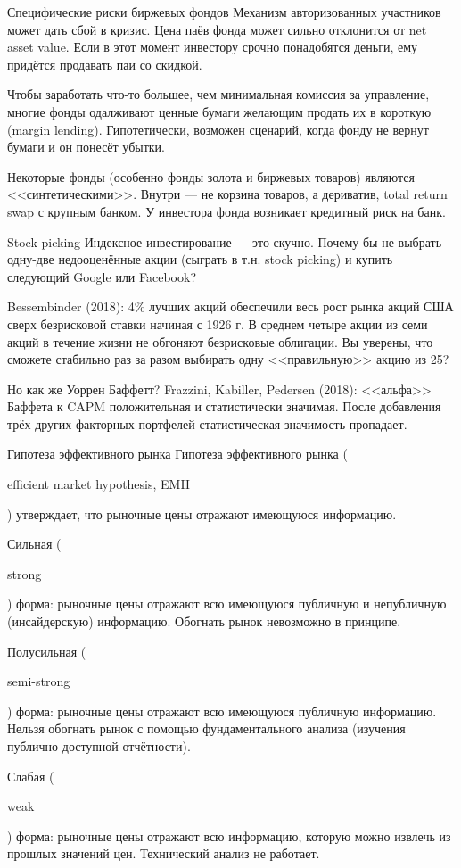 \documentclass{beamer}
\newcommand{\en}[1]{\begin{otherlanguage}{english}#1\end{otherlanguage}}
\begin{document}
\begin{frame}{Специфические риски биржевых фондов}
\justify
Механизм авторизованных участников может дать сбой в кризис. Цена паёв фонда может сильно отклонится от net asset value. Если в этот момент инвестору срочно понадобятся деньги, 
ему придётся продавать паи со скидкой.

\justify
Чтобы заработать что-то большее, чем минимальная комиссия за управление, многие 
фонды одалживают ценные бумаги желающим продать их в короткую (margin lending). 
Гипотетически, возможен сценарий, когда фонду не вернут бумаги и он понесёт 
убытки.

\justify
Некоторые фонды (особенно фонды золота и биржевых товаров) являются 
<<синтетическими>>. Внутри --- не корзина товаров, а дериватив, total return 
swap с крупным банком. У инвестора фонда возникает кредитный риск на банк.
\end{frame}



\begin{frame}{Stock picking}
\justify
Индексное инвестирование --- это скучно. Почему бы не выбрать одну-две 
недооценённые акции (сыграть в т.н. stock picking) и купить следующий Google 
или Facebook?

\justify
Bessembinder (2018): 4\% лучших акций обеспечили весь рост рынка акций США 
сверх безрисковой ставки начиная с 1926 г. В среднем четыре акции из семи акций 
в течение жизни не обгоняют безрисковые облигации. Вы уверены, что сможете 
стабильно раз за разом выбирать одну <<правильную>> акцию из 25?

\justify
Но как же Уоррен Баффетт? Frazzini, Kabiller, Pedersen (2018): <<альфа>> Баффета 
к CAPM положительная и статистически значимая. После добавления трёх других 
факторных портфелей статистическая значимость пропадает.
\end{frame}



\begin{frame}{Гипотеза эффективного рынка}
\justify
Гипотеза эффективного рынка (\en{efficient market hypothesis, EMH}) утверждает,
что рыночные цены отражают имеющуюся информацию.

\justify
Сильная (\en{strong}) форма: рыночные цены отражают всю имеющуюся публичную
и непубличную (инсайдерскую) информацию. Обогнать рынок невозможно в принципе.

\justify
Полусильная (\en{semi-strong}) форма: рыночные цены отражают всю имеющуюся 
публичную информацию. Нельзя обогнать рынок с помощью фундаментального анализа
(изучения публично доступной отчётности).

\justify
Слабая (\en{weak}) форма: рыночные цены отражают всю информацию, которую можно
извлечь из прошлых значений цен. Технический анализ не работает.
\end{frame}
\end{document}
